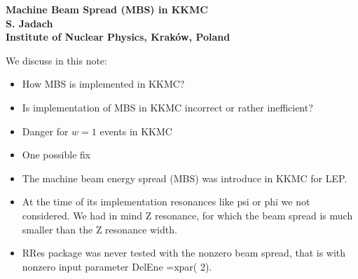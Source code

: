 \documentclass[dvips]{seminar}                      %
\begin{document}



\begin{slide}

\begin{center}
{\Large\bf\crd   Machine Beam Spread (MBS) in KKMC}\\
\vspace{2mm}
{\Large\bf\cbl   S. Jadach}\\
\vspace{2mm}
{\large\bf       Institute of Nuclear Physics, Krak\'ow, Poland}
\end{center}

\vspace{1mm}
{\small\Cmar
  We discuss in this note:
  \begin{itemize}
  \item
    How MBS is implemented in KKMC?
  \item
    Is implementation of MBS in KKMC incorrect or rather inefficient?
  \item
    Danger for $w=1$ events in KKMC
  \item
    One possible fix
  \end{itemize}
}

\vfill
\end{slide}   %



\begin{slide}

\begin{itemize}
\item
  The machine beam energy spread (MBS) was introduce in KKMC for LEP.
\item
  At the time of its implementation resonances like psi or phi we not considered.
  We had in mind Z resonance, for which the beam spread is
  much smaller than the Z resonance width.
\item
  RRes package was never tested with the nonzero beam spread,
  that is with nonzero input parameter DelEne =xpar( 2).
\end{itemize}

\vfill
\end{slide}    %
\end{document}
